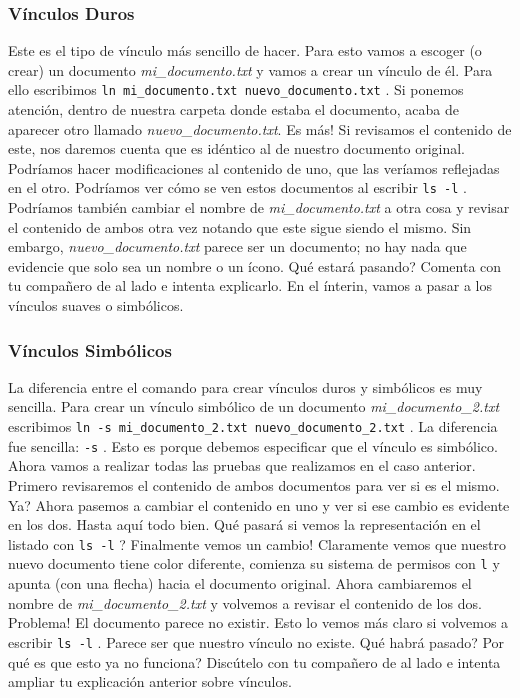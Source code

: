 \documentclass[10pt,letterpaper]{article}
\newcommand{\inlinecode}[1]{
\colorbox{light-gray}{\texttt{#1}}
}
\begin{document}
\subsubsection{V\'inculos Duros}
Este es el tipo de v\'inculo m\'as sencillo de hacer. Para esto vamos a escoger (o crear) un documento \emph{mi\_documento.txt} y vamos a crear un v\'inculo de \'el. Para ello escribimos \inlinecode{ln mi\_documento.txt nuevo\_documento.txt}. Si ponemos atenci\'on, dentro de nuestra carpeta donde estaba el documento, acaba de aparecer otro llamado \emph{nuevo\_documento.txt}. Es m\'as! Si revisamos el contenido de este, nos daremos cuenta que es id\'entico al de nuestro documento original. Podr\'iamos hacer modificaciones al contenido de uno, que las ver\'iamos reflejadas en el otro. Podr\'iamos ver c\'omo se ven estos documentos al escribir \inlinecode{ls -l}. Podr\'iamos tambi\'en cambiar el nombre de \emph{mi\_documento.txt} a otra cosa y revisar el contenido de ambos otra vez notando que este sigue siendo el mismo. Sin embargo, \emph{nuevo\_documento.txt} parece ser un documento; no hay nada que evidencie que solo sea un nombre o un \'icono. Qu\'e estar\'a pasando? Comenta con tu compa\~nero de al lado e intenta explicarlo. En el \'interin, vamos a pasar a los v\'inculos suaves o simb\'olicos.

\subsubsection{V\'inculos Simb\'olicos}
La diferencia entre el comando para crear v\'inculos duros y simb\'olicos es muy sencilla. Para crear un v\'inculo simb\'olico de un documento \emph{mi\_documento\_2.txt} escribimos \inlinecode{ln -s mi\_documento\_2.txt nuevo\_documento\_2.txt}. La diferencia fue sencilla: \inlinecode{-s}. Esto es porque debemos especificar que el v\'inculo es simb\'olico. Ahora vamos a realizar todas las pruebas que realizamos en el caso anterior. Primero revisaremos el contenido de ambos documentos para ver si es el mismo. Ya? Ahora pasemos a cambiar el contenido en uno y ver si ese cambio es evidente en los dos. Hasta aqu\'i todo bien. Qu\'e pasar\'a si vemos la representaci\'on en el listado con \inlinecode{ls -l}? Finalmente vemos un cambio! Claramente vemos que nuestro nuevo documento tiene color diferente, comienza su sistema de permisos con \inlinecode{l} y apunta (con una flecha) hacia el documento original. Ahora cambiaremos el nombre de \emph{mi\_documento\_2.txt} y volvemos a revisar el contenido de los dos. Problema! El documento parece no existir. Esto lo vemos m\'as claro si volvemos a escribir \inlinecode{ls -l}. Parece ser que nuestro v\'inculo no existe. Qu\'e habr\'a pasado? Por qu\'e es que esto ya no funciona? Disc\'utelo con tu compa\~nero de al lado e intenta ampliar tu explicaci\'on anterior sobre v\'inculos.
\end{document}
